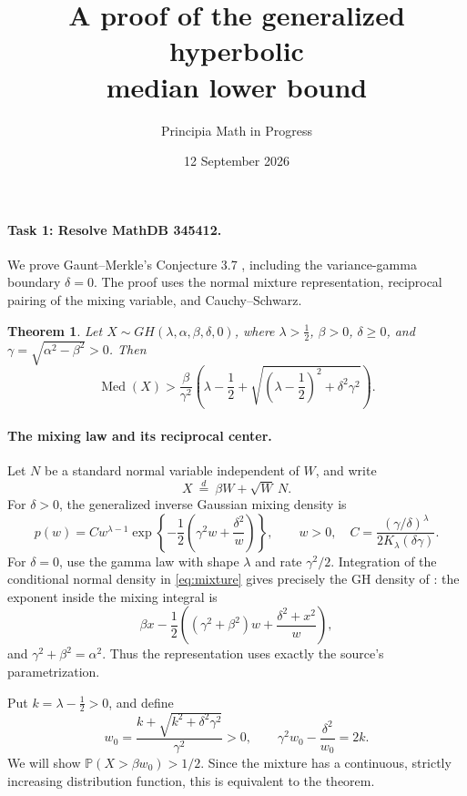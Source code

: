 \documentclass[11pt]{article}
\title{A proof of the generalized hyperbolic\\median lower bound}
\author{Principia Math in Progress}
\date{12 September 2026}
\newtheorem{theorem}{Theorem}
\newcommand{\Med}{\operatorname{Med}}
\newcommand{\Prob}{\mathbb P}
\begin{document}
\maketitle

\paragraph{Task 1: Resolve MathDB 345412.}
We prove Gaunt--Merkle's Conjecture 3.7 \cite{GM}, including the
variance-gamma boundary \(\delta=0\).
The proof uses the normal mixture representation, reciprocal pairing
of the mixing variable, and Cauchy--Schwarz.

\begin{theorem}\label{thm:main}
Let \(X\sim GH(\lambda,\alpha,\beta,\delta,0)\), where
\(\lambda>\tfrac12\), \(\beta>0\), \(\delta\geq0\), and
\(\gamma=\sqrt{\alpha^2-\beta^2}>0\). Then
\[
 \Med(X)>
 \frac{\beta}{\gamma^2}
 \left(\lambda-\frac12+
 \sqrt{\left(\lambda-\frac12\right)^2+\delta^2\gamma^2}\right).
\]
\end{theorem}

\paragraph{The mixing law and its reciprocal center.}
Let \(N\) be a standard normal variable independent of \(W\), and write
\begin{equation}\label{eq:mixture}
 X\ \stackrel d=\ \beta W+\sqrt W\,N.
\end{equation}
For \(\delta>0\), the generalized inverse Gaussian mixing density is
\begin{equation}\label{eq:gig}
 p(w)=C w^{\lambda-1}
       \exp\left\{-\frac12\left(\gamma^2w+\frac{\delta^2}{w}\right)\right\},
 \qquad w>0,\quad
 C=\frac{(\gamma/\delta)^\lambda}{2K_\lambda(\delta\gamma)}.
\end{equation}
For \(\delta=0\), use the gamma law with shape \(\lambda\) and rate
\(\gamma^2/2\). Integration of the conditional normal density in
\eqref{eq:mixture} gives precisely the GH density of \cite[eq.\ (1.1)]{GM}:
the exponent inside the mixing integral is
\[
 \beta x-\frac12\left((\gamma^2+\beta^2)w+
                            \frac{\delta^2+x^2}{w}\right),
\]
and \(\gamma^2+\beta^2=\alpha^2\).
Thus the representation uses exactly the source's parametrization.

Put \(k=\lambda-\tfrac12>0\), and define
\begin{equation}\label{eq:center}
 w_0=\frac{k+\sqrt{k^2+\delta^2\gamma^2}}{\gamma^2}>0,
 \qquad
 \gamma^2w_0-\frac{\delta^2}{w_0}=2k.
\end{equation}
We will show \(\Prob(X>\beta w_0)>1/2\).
Since the mixture has a continuous, strictly increasing distribution
function, this is equivalent to the theorem.
\end{document}
